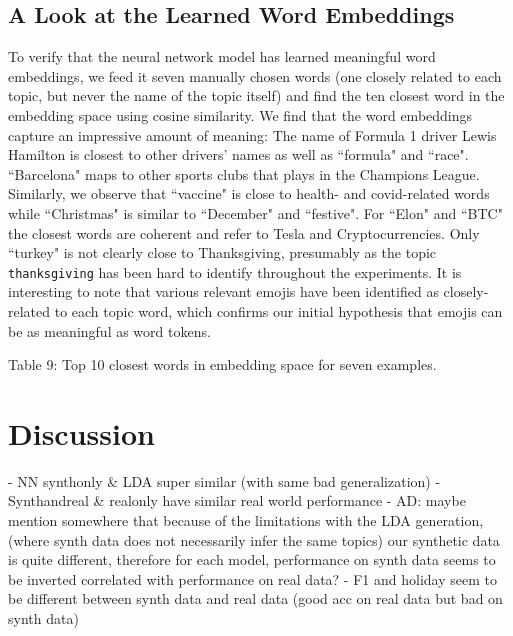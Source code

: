 \documentclass[11pt]{article}
\begin{document}
\subsection{A Look at the Learned Word Embeddings}
To verify that the neural network model has learned meaningful word embeddings, we feed it seven manually chosen words (one closely related to each topic, but never the name of the topic itself) and find the ten closest word in the embedding space using cosine similarity. We find that the word embeddings capture an impressive amount of meaning: The name of Formula 1 driver Lewis Hamilton is closest to other drivers' names as well as ``formula" and ``race". ``Barcelona" maps to other sports clubs that plays in the Champions League. Similarly,  we observe that ``vaccine" is close to health- and covid-related words while ``Christmas" is similar to ``December" and ``festive". For ``Elon" and ``BTC" the closest words are coherent and refer to Tesla and Cryptocurrencies. Only ``turkey" is not clearly close to Thanksgiving, presumably as the topic \texttt{thanksgiving} has been hard to identify throughout the experiments. It is interesting to note that various relevant emojis have been identified as closely-related to each topic word, which confirms our initial hypothesis that emojis can be as meaningful as word tokens.
\\

\begin{adjustbox}{width=\columnwidth,center}

\end{adjustbox}
\begin{center}
	Table 9: Top 10 closest words in embedding space for seven examples.
\end{center}

\section{Discussion}
- NN synthonly \& LDA super similar (with same bad generalization)
- Synthandreal \& realonly have similar real world performance
- AD: maybe mention somewhere that because of the limitations with the LDA generation, (where synth data does not necessarily infer the same topics) our synthetic data is quite different, therefore for each model, performance on synth data seems to be inverted correlated with performance on real data?
- F1 and holiday seem to be different between synth data and real data (good acc on real data but bad on synth data)
\end{document}
